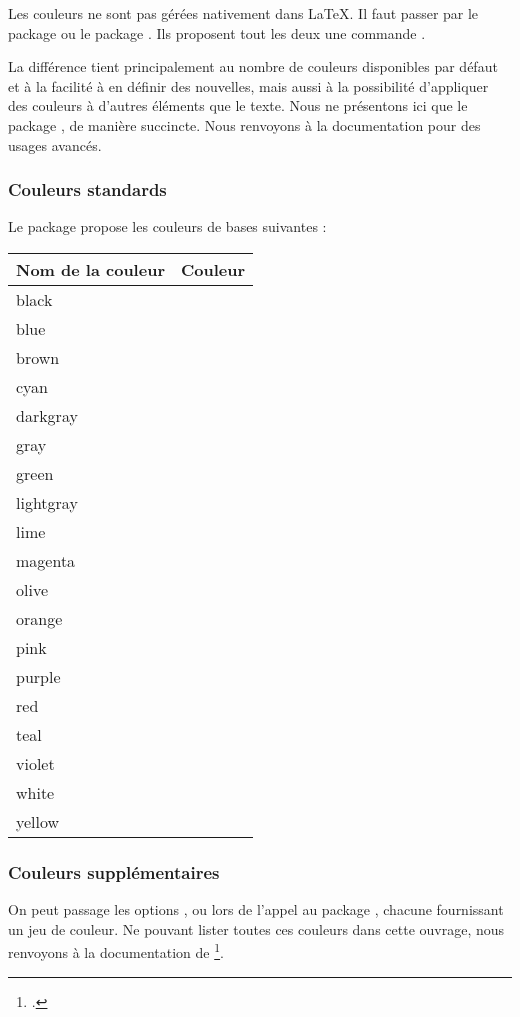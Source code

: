 Les couleurs ne sont pas gérées nativement dans \LaTeX. Il faut passer par le package  ou le package . Ils proposent tout les deux une commande .



La différence tient principalement au nombre de couleurs disponibles par défaut et à la facilité à en définir des nouvelles, mais aussi à la possibilité d'appliquer des couleurs à d'autres éléments que le texte. Nous ne présentons ici que le package , de manière succincte. Nous renvoyons à la documentation pour des usages avancés.

\subsubsection{Couleurs standards}
Le package  propose les couleurs de bases suivantes : 

\newcommand{\exemplecouleur}[1]{#1 & \fcolorbox{black}{#1}{~} \\}

\begin{longtable}{|l|l|}
    \hline
    Nom de la couleur         & Couleur                                 \\
    \hline
    \endhead
    \hline
    \endfoot
    \exemplecouleur{black}
    \exemplecouleur{blue}
    \exemplecouleur{brown}
    \exemplecouleur{cyan}
    \exemplecouleur{darkgray}
    \exemplecouleur{gray}
    \exemplecouleur{green}
    \exemplecouleur{lightgray}
    \exemplecouleur{lime}
    \exemplecouleur{magenta}
    \exemplecouleur{olive}
    \exemplecouleur{orange}
    \exemplecouleur{pink}
    \exemplecouleur{purple}
    \exemplecouleur{red}
    \exemplecouleur{teal}
    \exemplecouleur{violet}
    \exemplecouleur{white}
    \exemplecouleur{yellow}
    
\end{longtable}

\subsubsection{Couleurs supplémentaires}

On peut passage les options ,  ou  lors de l'appel au package , chacune fournissant un jeu de couleur. Ne pouvant lister toutes ces couleurs dans cette ouvrage, nous renvoyons à la documentation de \footcite{xcolor_jeu}.

